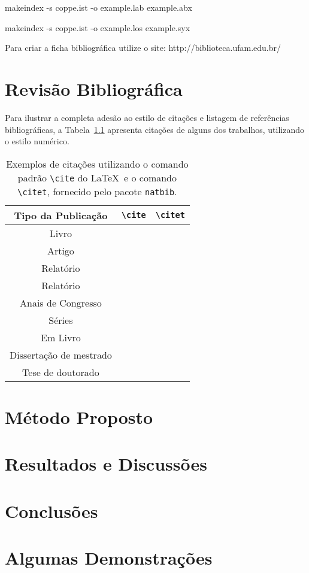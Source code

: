 \documentclass[msc,numbers]{ufamppgee}
\begin{document}
  makeindex -s coppe.ist -o example.lab example.abx
  
  makeindex -s coppe.ist -o example.los example.syx
  
  Para criar a ficha bibliográfica utilize o site: http://biblioteca.ufam.edu.br/

  \chapter{Revisão Bibliográfica}

  Para ilustrar a completa adesão ao estilo de citações e listagem de
  referências bibliográficas, a Tabela~\ref{tab:citation} apresenta citações de alguns dos trabalhos, utilizando o estilo numérico.

  \begin{table}[h]
  \caption{Exemplos de citações utilizando o comando padrão
    \texttt{\textbackslash cite} do \LaTeX\ e
    o comando \texttt{\textbackslash citet},
    fornecido pelo pacote \texttt{natbib}.}
  \label{tab:citation}
  \centering
  {\footnotesize
  \begin{tabular}{|c|c|c|}
    \hline
    Tipo da Publicação & \verb|\cite| & \verb|\citet|\\
    \hline
    Livro & \cite{book-example} & \citet{book-example}\\
    Artigo & \cite{article-example} & \citet{article-example}\\
    Relat\'orio & \cite{techreport-example} & \citet{techreport-example}\\
    Relat\'orio & \cite{techreport-exampleIn} & \citet{techreport-exampleIn}\\
    Anais de Congresso & \cite{inproceedings-example} &
      \citet{inproceedings-example}\\
    S\'eries & \cite{incollection-example} & \citet{incollection-example}\\
    Em Livro & \cite{inbook-example} & \citet{inbook-example}\\
    Disserta{\c c}\~ao de mestrado & \cite{mastersthesis-example} &
      \citet{mastersthesis-example}\\
    Tese de doutorado & \cite{phdthesis-example} & \citet{phdthesis-example}\\
    \hline
  \end{tabular}}
  \end{table}

  \chapter{Método Proposto}
  \chapter{Resultados e Discussões}
  \chapter{Conclusões}
  
  \backmatter
  
  

  \appendix
  \chapter{Algumas Demonstrações}
\end{document}

